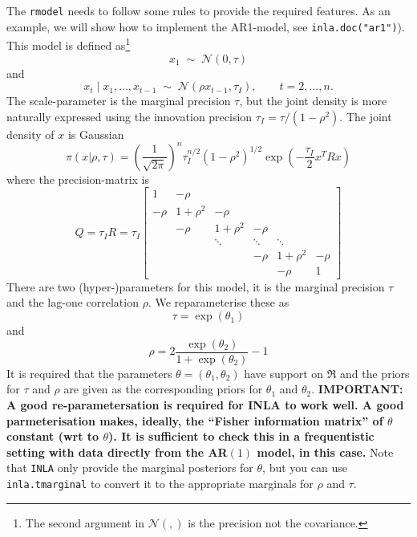 \documentclass[a4paper,11pt]{article}
\begin{document}
The \texttt{rmodel} needs to follow some rules to provide the required
features. As an example, we will show how to implement the AR1-model,
see \texttt{inla.doc("ar1")}). This model is defined as\footnote{The
    second argument in ${\mathcal N}(,)$ is the precision not the
    covariance.}
\begin{displaymath}
    x_{1} \;\sim\; {\mathcal N}(0, \tau)
\end{displaymath}
and
\begin{displaymath}
    x_{t} \mid x_{1}, \ldots, x_{t-1} \;\sim\; {\mathcal N}(\rho
    x_{t-1}, \tau_{I}), \qquad t=2, \ldots,n.
\end{displaymath}
The scale-parameter is the marginal precision $\tau$, but the joint
density is more naturally expressed using the innovation precision
$\tau_{I} = \tau/(1-\rho^{2})$. The joint density of $x$ is Gaussian
\begin{displaymath}
    \pi(x|\rho,\tau) = \left(\frac{1}{\sqrt{2\pi}}\right)^{n}
    \tau_{I}^{n/2} (1-\rho^{2})^{1/2}
    \exp\left(-\frac{\tau_{I}}{2} x^{T} R x\right)
\end{displaymath}
where the precision-matrix is
\begin{displaymath}
    Q = \tau_I R = 
    \tau_I
    \begin{bmatrix}
        1 & -\rho &&&& \\
        -\rho & 1+\rho^{2}& -\rho &&& \\
        &-\rho & 1+\rho^{2}& -\rho && \\
        && \ddots& \ddots& \ddots& \\
        &       &       &       -\rho & 1 + \rho^{2} & -\rho\\
        & & & & -\rho & 1
    \end{bmatrix}
\end{displaymath}
There are two (hyper-)parameters for this model, it is the marginal
precision $\tau$ and the lag-one correlation $\rho$.  We
reparameterise these as
\begin{displaymath}
    \tau = \exp(\theta_1) 
\end{displaymath}
and
\begin{displaymath}
    \rho = 2\frac{\exp(\theta_{2})}{1+\exp(\theta_{2})} - 1
\end{displaymath}
It is required that the parameters $\theta = (\theta_{1}, \theta_{2})$
have support on $\Re$ and the priors for $\tau$ and $\rho$ are given
as the corresponding priors for $\theta_{1}$ and $\theta_{2}$.
\textbf{IMPORTANT: A good re-parametersation is required for INLA to
    work well. A good parmeterisation makes, ideally, the ``Fisher
    information matrix'' of $\theta$ constant (wrt to $\theta$). It is
    sufficient to check this in a frequentistic setting with data
    directly from the AR$(1)$ model, in this case.} Note that
\texttt{INLA} only provide the marginal posteriors for $\theta$, but
you can use \texttt{inla.tmarginal} to convert it to the appropriate
marginals for $\rho$ and $\tau$.
\end{document}
